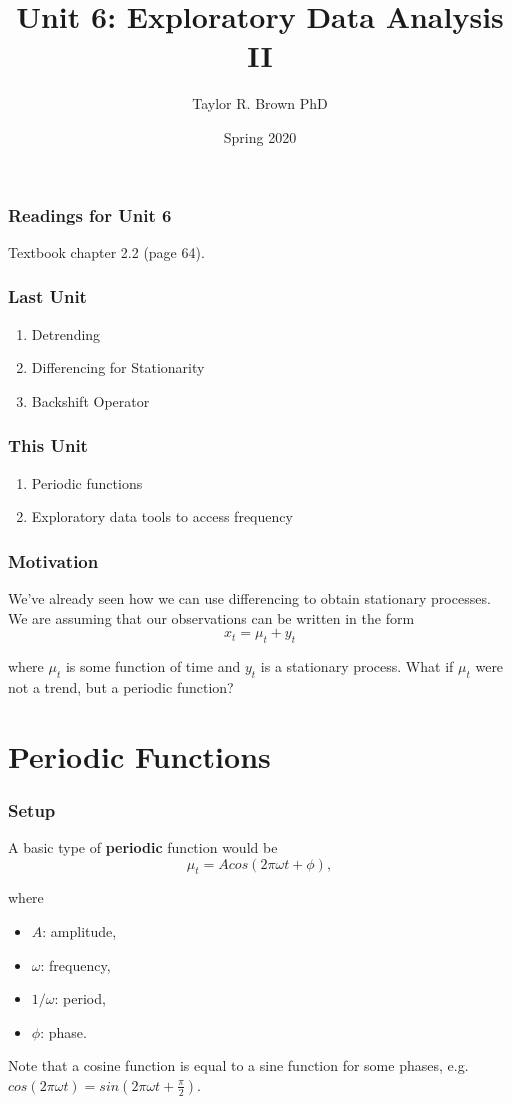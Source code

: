 \documentclass[%
xcolor=pdftex]{beamer}
\title{Unit 6: Exploratory Data Analysis II}
\author[STAT 5170: Applied Time Series, Unit 6]{Taylor R. Brown PhD}
\institute{Department of Statistics, University of Virginia}
\date{Spring 2020}
\begin{document}
\frame{\titlepage}


\begin{frame}
\frametitle{Readings for Unit 6}

Textbook chapter 2.2 (page 64).

\end{frame}


\begin{frame}
\frametitle{Last Unit}
\begin{enumerate}
\item Detrending
\item Differencing for Stationarity
\item Backshift Operator
\end{enumerate}
\end{frame}

\begin{frame}
\frametitle{This Unit}
\begin{enumerate}
\item Periodic functions
\item Exploratory data tools to access frequency
\end{enumerate}
\end{frame}

\begin{frame}
\frametitle{Motivation}

We've already seen how we can use differencing to obtain stationary processes.  We are assuming that our observations can be written in the form
\begin{equation} \label{eq:basic}
x_t=\mu_t+y_t
\end{equation}

where $\mu_t$ is some function of time and $y_t$ is a
stationary process. What if $\mu_t$ were not a
trend, but a periodic function?

\end{frame}

\section{Periodic Functions}
\frame{\tableofcontents[currentsection]}

\begin{frame}
\frametitle{Setup}

A basic type of \textbf{periodic}
function would be
$$
\mu_t=A cos( 2 \pi \omega t + \phi),
$$

where

\begin{itemize}
\item $A$: amplitude,
\item $\omega$: frequency,
\item $1/\omega$: period,
\item $\phi$: phase.
\end{itemize}

Note that a cosine function is equal to a sine function for some phases, e.g. $cos(2 \pi \omega t)  = sin(2 \pi \omega t + \frac{\pi}{2})$.

\end{frame}
\end{document}
